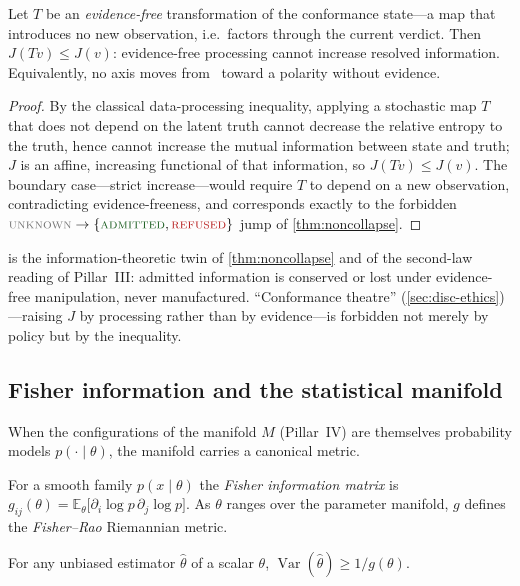 \begin{proposition}
\label{prop:dpi}
Let $T$ be an \emph{evidence-free} transformation of the conformance state---a map
that introduces no new observation, i.e.\ factors through the current verdict. Then
$J(Tv)\le J(v)$: evidence-free processing cannot increase resolved information.
Equivalently, no axis moves from \unknownstat\ toward a polarity without evidence.
\end{proposition}
\begin{proof}
By the classical data-processing inequality, applying a stochastic map $T$ that does
not depend on the latent truth cannot decrease the relative entropy to the truth,
hence cannot increase the mutual information between state and truth; $J$ is an
affine, increasing functional of that information, so $J(Tv)\le J(v)$. The boundary
case---strict increase---would require $T$ to depend on a new observation,
contradicting evidence-freeness, and corresponds exactly to the forbidden
$\unknownstat\to\{\admitted,\refused\}$ jump of \cref{thm:noncollapse}.
\end{proof}

 is the information-theoretic twin of \cref{thm:noncollapse} and of
the second-law reading of Pillar~III: admitted information is conserved or lost
under evidence-free manipulation, never manufactured. ``Conformance theatre''
(\cref{sec:disc-ethics})---raising $J$ by processing rather than by evidence---is
forbidden not merely by policy but by the inequality.

\subsection{Fisher information and the statistical manifold}
\label{sec:meas-fisher}

When the configurations of the manifold $M$ (Pillar~IV) are themselves probability
models $p(\cdot\mid\theta)$, the manifold carries a canonical metric.

\begin{definition}
For a smooth family $p(x\mid\theta)$ the \emph{Fisher information matrix} is
$g_{ij}(\theta)=\mathbb E_\theta\!\bigl[\partial_i\log p\,\partial_j\log p\bigr]$.
As $\theta$ ranges over the parameter manifold, $g$ defines the \emph{Fisher--Rao}
Riemannian metric.
\end{definition}

\begin{proposition}
\label{prop:cramer-rao}
For any unbiased estimator $\hat\theta$ of a scalar $\theta$,
$\operatorname{Var}(\hat\theta)\ge 1/g(\theta)$.
\end{proposition}


